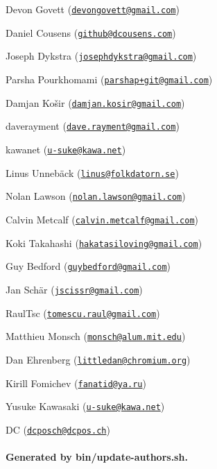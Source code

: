 \begin{DoxyItemize}
\item Devon Govett (\href{mailto:devongovett@gmail.com}{\tt devongovett@gmail.\+com})
\item Daniel Cousens (\href{mailto:github@dcousens.com}{\tt github@dcousens.\+com})
\item Joseph Dykstra (\href{mailto:josephdykstra@gmail.com}{\tt josephdykstra@gmail.\+com})
\item Parsha Pourkhomami (\href{mailto:parshap+git@gmail.com}{\tt parshap+git@gmail.\+com})
\item Damjan Košir (\href{mailto:damjan.kosir@gmail.com}{\tt damjan.\+kosir@gmail.\+com})
\item daverayment (\href{mailto:dave.rayment@gmail.com}{\tt dave.\+rayment@gmail.\+com})
\item kawanet (\href{mailto:u-suke@kawa.net}{\tt u-\/suke@kawa.\+net})
\item Linus Unnebäck (\href{mailto:linus@folkdatorn.se}{\tt linus@folkdatorn.\+se})
\item Nolan Lawson (\href{mailto:nolan.lawson@gmail.com}{\tt nolan.\+lawson@gmail.\+com})
\item Calvin Metcalf (\href{mailto:calvin.metcalf@gmail.com}{\tt calvin.\+metcalf@gmail.\+com})
\item Koki Takahashi (\href{mailto:hakatasiloving@gmail.com}{\tt hakatasiloving@gmail.\+com})
\item Guy Bedford (\href{mailto:guybedford@gmail.com}{\tt guybedford@gmail.\+com})
\item Jan Schär (\href{mailto:jscissr@gmail.com}{\tt jscissr@gmail.\+com})
\item Raul\+Tsc (\href{mailto:tomescu.raul@gmail.com}{\tt tomescu.\+raul@gmail.\+com})
\item Matthieu Monsch (\href{mailto:monsch@alum.mit.edu}{\tt monsch@alum.\+mit.\+edu})
\item Dan Ehrenberg (\href{mailto:littledan@chromium.org}{\tt littledan@chromium.\+org})
\item Kirill Fomichev (\href{mailto:fanatid@ya.ru}{\tt fanatid@ya.\+ru})
\item Yusuke Kawasaki (\href{mailto:u-suke@kawa.net}{\tt u-\/suke@kawa.\+net})
\item DC (\href{mailto:dcposch@dcpos.ch}{\tt dcposch@dcpos.\+ch})
\end{DoxyItemize}

\paragraph*{Generated by bin/update-\/authors.\+sh.}